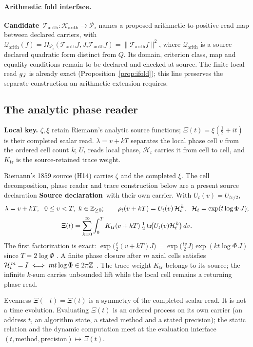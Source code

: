 \documentclass[11pt,a4paper]{article}
\DeclareMathOperator{\tr}{tr}\DeclareMathOperator{\sig}{sig}\DeclareMathOperator{\arccosh}{arccosh}
\newcommand{\st}[1]{\textsf{\small\textbf{#1}}}
\newcommand{\Ssrc}{\st{Source declaration}}\newcommand{\Sint}{\st{Interface}}
\newcommand{\Scand}{\st{Candidate}}
\newcommand{\lkey}[1]{\par\noindent\textbf{Local key.} #1\par\smallskip}
\theoremstyle{plain}
\theoremstyle{definition}
\theoremstyle{remark}
\begin{document}
\paragraph{Arithmetic fold interface.} \Scand\ $\mathcal T_{\mathrm{arith}}:\mathcal K_{\mathrm{arith}}\to\mathcal P_i$ names a proposed arithmetic-to-positive-read map between declared carriers, with $\mathcal Q_{\mathrm{arith}}(f)=\Omega_{\mathcal P_i}(\mathcal T_{\mathrm{arith}}f,J_i\mathcal T_{\mathrm{arith}}f)=\|\mathcal T_{\mathrm{arith}}f\|^2$, where $\mathcal Q_{\mathrm{arith}}$ is a source-declared quadratic form distinct from $Q$. Its domain, criterion class, map and equality conditions remain to be declared and checked at source. The finite local read $g_J$ is already exact (Proposition~\ref{prop:ifold}); this line preserves the separate construction an arithmetic extension requires.

\subsection{The analytic phase reader}
\lkey{$\zeta,\xi$ retain Riemann's analytic source functions; $\Xi(t)=\xi(\tfrac12+it)$ is their completed scalar read. $\lambda=v+kT$ separates the local phase cell $v$ from the ordered cell count $k$; $U_t$ reads local phase, $\mathcal H_t$ carries it from cell to cell, and $K_{\mathrm{tr}}$ is the source-retained trace weight.}
Riemann's 1859 source (H14) carries $\zeta$ and the completed $\xi$. The cell decomposition, phase reader and trace construction below are a present source declaration \Ssrc\ with their own carrier. With $U_t(v)=U_{tv/2}$,
\[
\begin{gathered}
\lambda=v+kT,\ \ 0\le v<T,\ k\in\ZZ_{\ge0};\qquad
\rho_t(v+kT)=U_t(v)\,\mathcal H_t^{\,k},\ \ \mathcal H_t=\exp(t\log\Phi\,J);\\[2pt]
\Xi(t)=\sum_{k=0}^{\infty}\int_0^T K_{\mathrm{tr}}(v+kT)\,\tfrac12\tr\!\bigl(U_t(v)\mathcal H_t^{\,k}\bigr)\,dv .
\end{gathered}
\]
The first factorization is exact: $\exp\bigl(\tfrac t2(v+kT)J\bigr)=\exp\bigl(\tfrac{tv}2J\bigr)\exp(kt\log\Phi\,J)$ since $T=2\log\Phi$ \Sder. A finite phase closure after $m$ axial cells satisfies $\mathcal H_t^{\,m}=I\iff mt\log\Phi\in2\pi\mathbb{Z}$ \Sder. The trace weight $K_{\mathrm{tr}}$ belongs to its source; the infinite $k$-sum carries unbounded lift while the local cell remains a returning phase read.

Evenness $\Xi(-t)=\Xi(t)$ is a symmetry of the completed scalar read. It is not a time evolution. Evaluating $\Xi(t)$ is an ordered process on its own carrier (an address $t$, an algorithm state, a stated method and a stated precision); the static relation and the dynamic computation meet at the evaluation interface $(t,\text{method},\text{precision})\mapsto\Xi(t)$.
\end{document}
